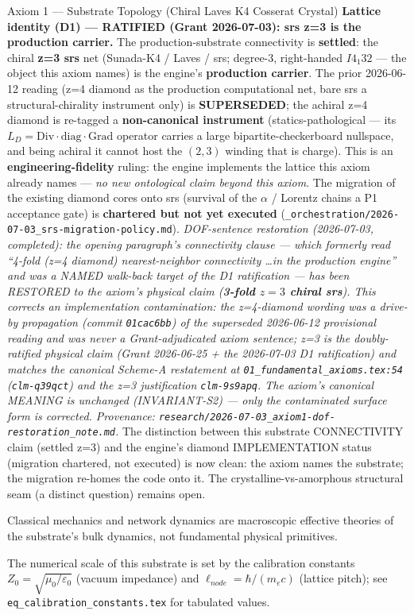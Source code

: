 \begin{resultbox}{Axiom 1 — Substrate Topology (Chiral Laves K4 Cosserat Crystal)}
\medskip\noindent
\textbf{Lattice identity (D1) --- RATIFIED (Grant 2026-07-03): srs z=3 is the production carrier.} The production-substrate connectivity is \textbf{settled}: the chiral \textbf{z=3 srs} net (Sunada-K4 / Laves / srs; degree-3, right-handed $I4_1 32$ --- the object this axiom names) is the engine's \textbf{production carrier}. The prior 2026-06-12 reading (z=4 diamond as the production computational net, bare srs a structural-chirality instrument only) is \textbf{SUPERSEDED}; the achiral z=4 diamond is re-tagged a \textbf{non-canonical instrument} (statics-pathological --- its $L_D = \mathrm{Div}\cdot\mathrm{diag}\cdot\mathrm{Grad}$ operator carries a large bipartite-checkerboard nullspace, and being achiral it cannot host the $(2,3)$ winding that is charge). This is an \textbf{engineering-fidelity} ruling: the engine implements the lattice this axiom already names --- \emph{no new ontological claim beyond this axiom}. The migration of the existing diamond cores onto srs (survival of the $\alpha$ / Lorentz chains a P1 acceptance gate) is \textbf{chartered but not yet executed} (\texttt{\_orchestration/2026-07-03\_srs-migration-policy.md}). \emph{DOF-sentence restoration (2026-07-03, completed): the opening paragraph's connectivity clause --- which formerly read ``4-fold (z=4 diamond) nearest-neighbor connectivity \ldots in the production engine'' and was a NAMED walk-back target of the D1 ratification --- has been RESTORED to the axiom's physical claim (\textbf{3-fold $z=3$ chiral srs}). This corrects an implementation contamination: the z=4-diamond wording was a drive-by propagation (commit \texttt{01cac6bb}) of the superseded 2026-06-12 provisional reading and was never a Grant-adjudicated axiom sentence; z=3 is the doubly-ratified physical claim (Grant 2026-06-25 + the 2026-07-03 D1 ratification) and matches the canonical Scheme-A restatement at \texttt{01\_fundamental\_axioms.tex:54} (\texttt{clm-q39qct}) and the z=3 justification \texttt{clm-9s9apq}. The axiom's canonical MEANING is unchanged (INVARIANT-S2) --- only the contaminated surface form is corrected. Provenance: \texttt{research/2026-07-03\_axiom1-dof-restoration\_note.md}.} The distinction between this substrate CONNECTIVITY claim (settled z=3) and the engine's diamond IMPLEMENTATION status (migration chartered, not executed) is now clean: the axiom names the substrate; the migration re-homes the code onto it. The crystalline-vs-amorphous structural seam (a distinct question) remains open.

\medskip\noindent
Classical mechanics and network dynamics are macroscopic effective theories of the substrate's bulk dynamics, not fundamental physical primitives.

\medskip\noindent
The numerical scale of this substrate is set by the calibration constants $Z_0 = \sqrt{\mu_0/\varepsilon_0}$ (vacuum impedance) and $\ell_{node} = \hbar/(m_e c)$ (lattice pitch); see \texttt{eq\_calibration\_constants.tex} for tabulated values.
\end{resultbox}

